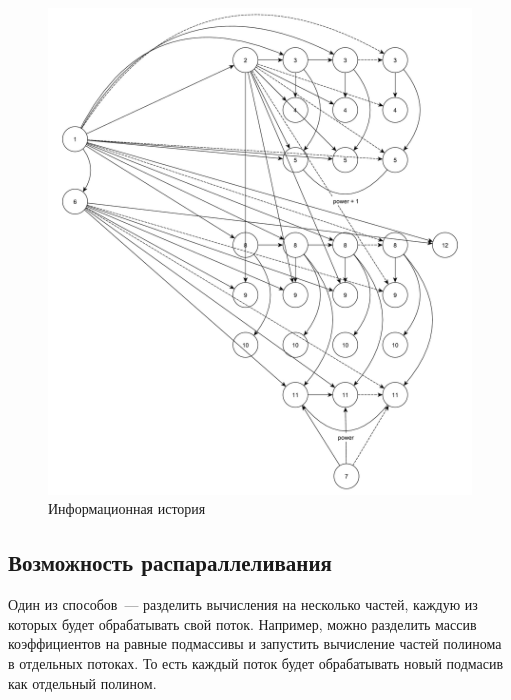 \begin{figure}[h]
	\centering
	\includegraphics[height=0.7\textheight, page=1]{img/информационная_история.pdf}
	\caption{Информационная история}
\end{figure}

\subsection{Возможность распараллеливания}

Один из способов~--- разделить вычисления на несколько частей, каждую из которых будет обрабатывать свой поток. 
Например, можно разделить массив коэффициентов на равные подмассивы и запустить вычисление частей полинома в отдельных потоках. 
То есть каждый поток будет обрабатывать новый подмасив как отдельный полином.